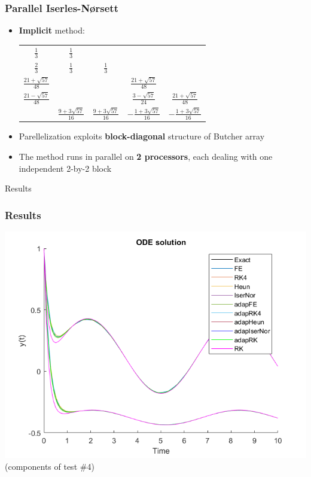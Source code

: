 \documentclass{beamer}
\begin{document}
\begin{frame} %
	\frametitle{Parallel Iserles-Nørsett}
	\begin{itemize}
		\item \textbf{Implicit} method:
		\begin{center}
			\begin{tabular}{c|cccc}
				$\frac{1}{3}$ & $\frac{1}{3}$ & & & \\
				$\frac{2}{3}$ & $\frac{1}{3}$ & $\frac{1}{3}$ & & \\
				$\frac{21+\sqrt{57}}{48}$ & & & $\frac{21+\sqrt{57}}{48}$ & \\
				$\frac{21-\sqrt{57}}{48}$ & & & $\frac{3-\sqrt{57}}{24}$ & $\frac{21+\sqrt{57}}{48}$ \\
				\hline
				& $\frac{9+3\sqrt{57}}{16}$ & $\frac{9+3\sqrt{57}}{16}$ & $-\frac{1+3\sqrt{57}}{16}$ & $-\frac{1+3\sqrt{57}}{16}$
			\end{tabular}
		\vspace{20pt}
		\end{center}
		\item Parellelization exploits \textbf{block-diagonal} structure of Butcher array
		\item The method runs in parallel on \textbf{2 processors}, each dealing with one independent 2-by-2 block
	\end{itemize}
\end{frame}


\begin{frame}[c] %
\begin{center}
	\Huge \color{blue} Results
\end{center}
\end{frame}


\begin{frame} %
	\frametitle{Results}
	\begin{center}
		\includegraphics[width=0.8\linewidth]{etc/results_test_4.png} \\
		(components of test \#4)
	\end{center}
\end{frame}
\end{document}
